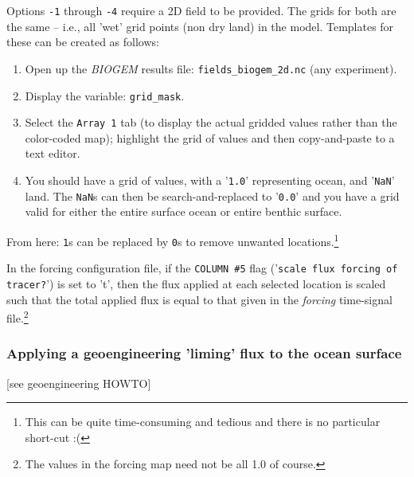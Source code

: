 \documentclass[11pt,fleqn]{book} %
\begin{document}
Options \texttt{-1} through \texttt{-4} require a 2D field to be provided. The grids for both are the same -- i.e., all 'wet' grid points (non dry land) in the model. Templates for these can be created as follows:

\begin{enumerate}[noitemsep]
\vspace{1mm}
\item Open up the \textit{BIOGEM} results file: \texttt{fields\_biogem\_2d.nc} (any experiment).
\vspace{1mm}
\item Display the variable: \texttt{grid\_mask}.
\vspace{1mm}
\item Select the \texttt{Array 1} tab (to display the actual gridded values rather than the color-coded map); highlight the grid of values and then copy-and-paste to a text editor.
\vspace{1mm}
\item You should have a grid of values, with a '\texttt{1.0}' representing ocean, and '\texttt{NaN}' land. The \texttt{NaN}s can then be search-and-replaced to '\texttt{0.0}' and you have a grid valid for either the entire surface ocean or entire benthic surface.
\end{enumerate}

From here: \texttt{1}s can be replaced by \texttt{0}s to remove unwanted locations.\footnote{This can be quite time-consuming and tedious and there is no particular short-cut :(}

In the forcing configuration file, if the \texttt{COLUMN \#5} flag ('\texttt{scale flux forcing of tracer?}') is set to 't', then the flux applied at each selected location is scaled such that the total applied flux is equal to that given in the \textit{forcing} time-signal file.\footnote{The values in the forcing map need not be all 1.0 of course.}

%
\newpage
\subsubsection{Applying a geoengineering 'liming' flux to the ocean surface}

\vspace{1mm}
[see geoengineering HOWTO]


\newpage

\end{document}
